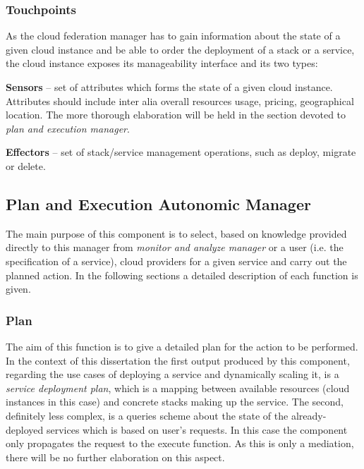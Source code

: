 \subsubsection*{Touchpoints}
As the cloud federation manager has to gain information about the state of a given cloud instance and be able to order the deployment of a stack or a service, the cloud instance exposes its manageability interface and its two types:
\begin{asparaenum}
\item[\textbf{Sensors}] -- set of attributes which forms the state of a given cloud instance. Attributes should include inter alia overall resources usage, pricing, geographical location. The more thorough elaboration will be held in the section devoted to \emph{plan and execution manager}.
\item[\textbf{Effectors}] -- set of stack/service management operations, such as deploy, migrate or delete.
\end{asparaenum}

\subsection{Plan and Execution Autonomic Manager}
The main purpose of this component is to select, based on knowledge provided directly to this manager from \emph{monitor and analyze manager} or a user (i.e. the specification of a service), cloud providers for a given service and carry out the planned action. In the following sections a detailed description of each function is given.

\subsubsection{Plan}
The aim of this function is to give a detailed plan for the action to be performed. In the context of this dissertation the first output produced by this component, regarding the use cases of deploying a service and dynamically scaling it, is a \emph{service deployment plan}, which is a mapping between available resources (cloud instances in this case) and concrete stacks making up the service. The second, definitely less complex, is a queries scheme about the state of the already-deployed services which is based on user's requests. In this case the component only propagates the request to the execute function. As this is only a mediation, there will be no further elaboration on this aspect.

